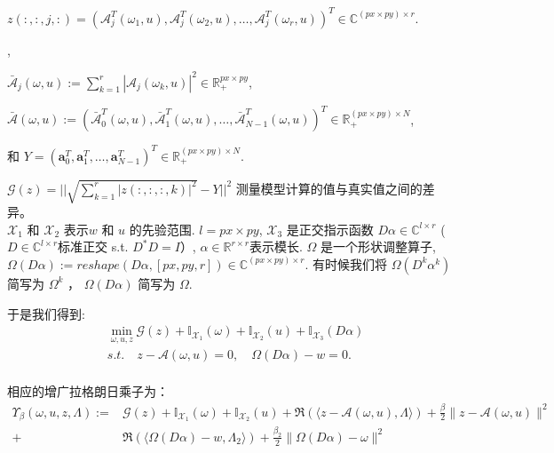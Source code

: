 \documentclass[12pt]{article}
\begin{document}
$z(:,:,j,:) =\left(\mathcal{A}_{j}^{T}(\omega_1, u), \mathcal{A}_{j}^{T}(\omega_2, u), \ldots, \mathcal{A}_{j}^{T}(\omega_r, u)\right)^{T} 
\in \mathbb{C}^{(px\times py) \times r}$.


,

$\bar{\mathcal{A}}_{j}(\omega, u):= \sum_{k=1}^r |\mathcal{A}_{j}(\omega_k, u)|^2 \in \mathbb{R}_+^{px\times py}$,

$\bar{\mathcal{A}}(\omega, u):=\left(\bar{\mathcal{A}}_{0}^{T}(\omega, u), \bar{\mathcal{A}}_{1}^{T}(\omega, u), \ldots,\bar{\mathcal{A}}_{N-1}^{T}(\omega, u)\right)^{T} 
\in \mathbb{R}_+^{(px\times py) \times N}$,



和 $Y=\left(\boldsymbol{a}_{0}^{T}, \boldsymbol{a}_{1}^{T}, \ldots, \boldsymbol{a}_{N-1}^{T}\right)^{T} \in \mathbb{R}_{+}^{(px \times py) \times N }$.




$\mathcal{G}(z)= || \sqrt{ \sum_{k=1}^{r} |z(:,:,:,k)|^2} - Y||^2$ 测量模型计算的值与真实值之间的差异。\\
$\mathcal{X}_{1}$ 和 $\mathcal{X}_{2}$ 表示$w$ 和 $u$ 的先验范围. $l=px \times py$, $\mathcal{X}_{3}$ 是正交指示函数 $D\alpha \in \mathbb{C}^{l \times r}$ ( $D \in  \mathbb{C}^{l \times r}$标准正交 s.t. $D^*D=I$）,  $\alpha \in  \mathbb{R}^{r \times r}$表示模长.
$\Omega$ 是一个形状调整算子, $\Omega(D\alpha) := reshape(D\alpha,[px,py,r]) \in \mathbb{C}^{(px \times py) \times r}$. 有时候我们将 $\Omega(D^k\alpha^k)$ 简写为 $\Omega^k$ ， $\Omega(D\alpha)$ 简写为 $\Omega$.

于是我们得到:
\begin{equation}
\begin{aligned}
&\min _{\omega, u, z} \mathcal{G}(z)+\mathbb{I}_{\mathcal{X}_{1}}(\omega)+\mathbb{I}_{\mathcal{X}_{2}}(u)
+ \mathbb{I}_{\mathcal{X}_{3}}(D\alpha) \\
&s.t. \quad z-\mathcal{A}(\omega, u)=0, \quad \Omega(D\alpha) - w = 0. \\
\end{aligned}
\end{equation}

相应的增广拉格朗日乘子为：
$$
\begin{aligned}
\Upsilon_{\beta}(\omega, u, z, \Lambda):=&\mathcal{G}(z)+\mathbb{I}_{\mathcal{X}_{1}}(\omega)+\mathbb{I}_{\mathcal{X}_{2}}(u)+\Re(\langle z-\mathcal{A}(\omega, u), \Lambda\rangle)+\frac{\beta}{2}\|z-\mathcal{A}(\omega, u)\|^{2}
\\
+&\Re(\langle \Omega(D\alpha) - w, \Lambda_2\rangle)+\frac{\beta_2}{2}\| \Omega(D\alpha) - \omega\|^{2}
\end{aligned}
$$
\end{document}
